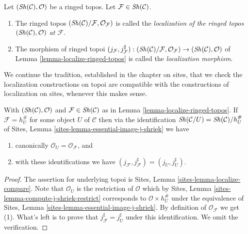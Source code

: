 \begin{definition}
\label{definition-localize-ringed-topos}
Let $(\mathop{\mathit{Sh}}\nolimits(\mathcal{C}), \mathcal{O})$ be a ringed topos.
Let $\mathcal{F} \in \mathop{\mathit{Sh}}\nolimits(\mathcal{C})$.
\begin{enumerate}
\item The ringed topos
$(\mathop{\mathit{Sh}}\nolimits(\mathcal{C})/\mathcal{F}, \mathcal{O}_\mathcal{F})$
is called the
{\it localization of the ringed topos
$(\mathop{\mathit{Sh}}\nolimits(\mathcal{C}), \mathcal{O})$ at $\mathcal{F}$}.
\item The morphism of ringed topoi
$(j_\mathcal{F}, j_\mathcal{F}^\sharp) :
(\mathop{\mathit{Sh}}\nolimits(\mathcal{C})/\mathcal{F}, \mathcal{O}_\mathcal{F})
\to
(\mathop{\mathit{Sh}}\nolimits(\mathcal{C}), \mathcal{O})$ of
Lemma \ref{lemma-localize-ringed-topos}
is called the {\it localization morphism}.
\end{enumerate}
\end{definition}

\noindent
We continue the tradition, established in the chapter on sites, that we
check the localization constructions on topoi are compatible with the
constructions of localization on sites, whenever this makes sense.

\begin{lemma}
\label{lemma-localize-compare}
With
$(\mathop{\mathit{Sh}}\nolimits(\mathcal{C}), \mathcal{O})$ and
$\mathcal{F} \in \mathop{\mathit{Sh}}\nolimits(\mathcal{C})$ as in
Lemma \ref{lemma-localize-ringed-topos}.
If $\mathcal{F} = h_U^\#$ for some object $U$ of $\mathcal{C}$
then via the identification
$\mathop{\mathit{Sh}}\nolimits(\mathcal{C}/U) = \mathop{\mathit{Sh}}\nolimits(\mathcal{C})/h_U^\#$ of
Sites, Lemma \ref{sites-lemma-essential-image-j-shriek}
we have
\begin{enumerate}
\item canonically $\mathcal{O}_U = \mathcal{O}_\mathcal{F}$, and
\item with these identifications
we have $(j_\mathcal{F}, j_\mathcal{F}^\sharp) = (j_U, j_U^\sharp)$.
\end{enumerate}
\end{lemma}

\begin{proof}
The assertion for underlying topoi is
Sites, Lemma \ref{sites-lemma-localize-compare}.
Note that $\mathcal{O}_U$ is the restriction of $\mathcal{O}$
which by
Sites, Lemma \ref{sites-lemma-compute-j-shriek-restrict}
corresponds to $\mathcal{O} \times h_U^\#$ under the equivalence of
Sites, Lemma \ref{sites-lemma-essential-image-j-shriek}.
By definition of $\mathcal{O}_\mathcal{F}$ we get (1).
What's left is to prove that $j_\mathcal{F}^\sharp = j_U^\sharp$
under this identification. We omit the verification.
\end{proof}

